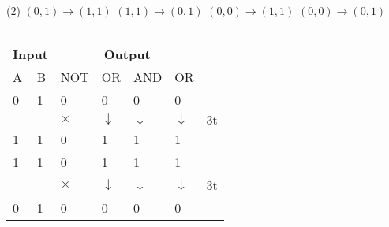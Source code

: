 \begin{enumerate}
\begin{tasks}(2)
\task[\textbf{A.}] $(0,1) \rightarrow(1,1)$
\task[\textbf{B.}] $(1,1) \rightarrow(0,1)$
\task[\textbf{C.}] $(0,0) \rightarrow(1,1)$
\task[\textbf{D.}] 	$(0,0) \rightarrow(0,1)$
\end{tasks}
\begin{answer}$\left. \right. $
\begin{table}[H]
	\centering
	\renewcommand*{\arraystretch}{1.2}
	\begin{tabular}{|p{1.5cm} p{1.5cm}|p{1.5cm}|p{1.5cm} |p{1.5cm}|p{1.5cm}|p{1.5cm}}
		\cline{1-6}
		\multicolumn{2}{|c|}{\textbf{Input }}&\multicolumn{4}{c|}{\textbf{Output }} & \\\cline{1-6}
		A&B&NOT & OR&AND&OR & \multirow{5}{*}{3t}\\\cline{1-6}
		0&1&0&0 & 0&0&\\
		& &$\times$&$\downarrow$ & $\downarrow$&$\downarrow$&\\ 
		1&1&0&1 & 1&1&\\ \cline{1-6}
		1&1&0&1 & 1&1&\\
		& &$\times$&$\downarrow$ & $\downarrow$&$\downarrow$&3t\\ 
		0&1&0&0 & 0&0&\\ \cline{1-6}
		

\end{tabular}
\end{table}
\end{answer}
\end{enumerate}
